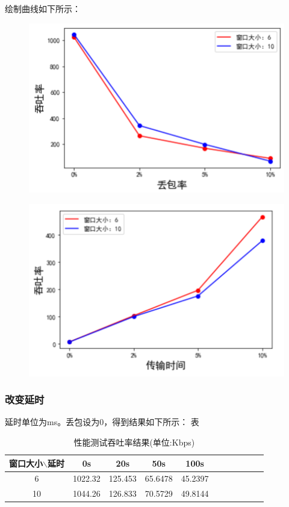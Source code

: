 \documentclass[UTF8,a4paper,10pt]{ctexart}
\begin{document}
绘制曲线如下所示：
\begin{figure}[H]
    \centering
    \includegraphics[scale=0.6]{计网5.png}
    \label{fig:5}
\end{figure}
\begin{figure}[H]
    \centering
    \includegraphics[scale=0.6]{计网6.png}
    \label{fig:6}
\end{figure}
\subsubsection{改变延时}
延时单位为ms。丢包设为0，得到结果如下所示：
表
\begin{table}[!htbp]
  \centering
  \begin{tabular}{ccccccccccc}
  \toprule  
  窗口大小$\backslash$延时& 0s& 20s& 50s& 100s\\
  \midrule
  6& 1022.32& 125.453& 65.6478& 45.2397\\
  10& 1044.26& 126.833& 70.5729& 49.8144\\
  \bottomrule
  \end{tabular}
  \caption{性能测试吞吐率结果(单位:Kbps)}
\end{table}
\end{document}
